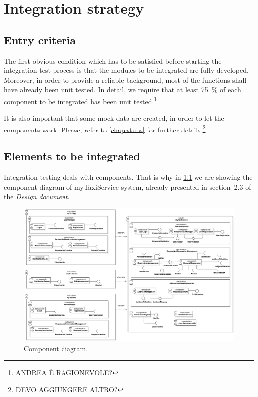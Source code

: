 \chapter{Integration strategy}\label{chap:strategy}



\section{Entry criteria}
The first obvious condition which has to be satisfied before starting the integration test process is that the modules to be integrated are fully developed. Moreover, in order to provide a reliable background, most of the functions shall have already been unit tested. In detail, we require that at least \SI{75}{\percent} of each component to be integrated has been unit tested.\footnote{\color{red}ANDREA \`E RAGIONEVOLE?} 

It is also important that some mock data are created, in order to let the components work. Please, refer to \cref{chap:stubs} for further details.\footnote{\color{red}DEVO AGGIUNGERE ALTRO?}




\section{Elements to be integrated}
Integration testing deals with components. That is why in \cref{fig:component} we are showing the component diagram of myTaxiService system, already presented in section~2.3 of the \emph{Design document}.

\begin{figure}%
	\centering%
	\includegraphics[width=\textwidth]{img/ComponentView__ComponentDiagram_1}%
	\caption{Component diagram.}%
	\label{fig:component}%
\end{figure}

